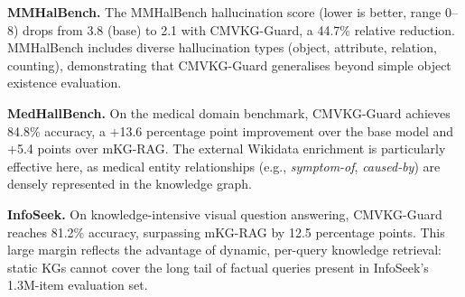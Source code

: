 \begin{table}[!t]
\centering
\caption{Cross-benchmark performance summary across all six evaluation datasets.
  $\downarrow$ = lower is better; $\uparrow$ = higher is better.
  All improvements are statistically significant ($p < 0.05$, paired $t$-test).}
\label{tab:all_benchmarks}
\end{table}

\noindent\textbf{MMHalBench.} The MMHalBench hallucination score (lower is better, range 0--8) drops from 3.8 (base) to 2.1 with CMVKG-Guard, a 44.7\% relative reduction. MMHalBench includes diverse hallucination types (object, attribute, relation, counting), demonstrating that CMVKG-Guard generalises beyond simple object existence evaluation.

\noindent\textbf{MedHallBench.} On the medical domain benchmark, CMVKG-Guard achieves 84.8\% accuracy, a +13.6 percentage point improvement over the base model and +5.4 points over mKG-RAG. The external Wikidata enrichment is particularly effective here, as medical entity relationships (e.g., \textit{symptom-of}, \textit{caused-by}) are densely represented in the knowledge graph.

\noindent\textbf{InfoSeek.} On knowledge-intensive visual question answering, CMVKG-Guard reaches 81.2\% accuracy, surpassing mKG-RAG by 12.5 percentage points. This large margin reflects the advantage of dynamic, per-query knowledge retrieval: static KGs cannot cover the long tail of factual queries present in InfoSeek's 1.3M-item evaluation set.

